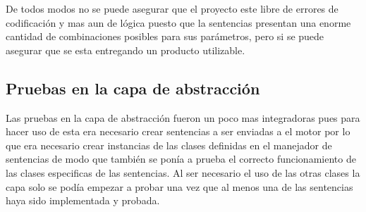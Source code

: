 De todos modos no se puede asegurar que el proyecto este libre de errores de codificación y mas aun de lógica puesto que la sentencias presentan una enorme cantidad de combinaciones posibles para sus parámetros, pero si se puede asegurar que se esta entregando un producto utilizable.
%
\subsection{Pruebas en la capa de abstracción}
Las pruebas en la capa de abstracción fueron un poco mas integradoras pues para hacer uso de esta era necesario crear sentencias a ser enviadas a el motor por lo que era necesario crear instancias de las clases definidas en el manejador de sentencias de modo que también se ponía a prueba el correcto funcionamiento de las clases especificas de las sentencias. Al ser necesario el uso de las otras clases la capa solo se podía empezar a probar una vez que al menos una de las sentencias haya sido implementada y probada.